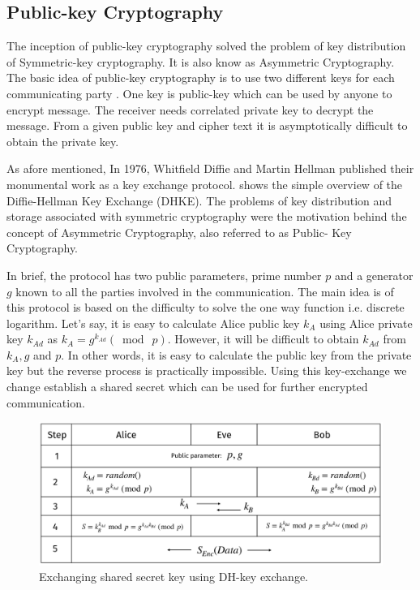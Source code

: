 \subsection{Public-key Cryptography}
\label{ch1_subsec_pkc}
The inception of public-key cryptography solved the problem of key distribution of Symmetric-key cryptography.
It is also know as Asymmetric Cryptography.
The basic idea of  public-key cryptography is to use two different keys for each communicating party .
One key is public-key which can be used by anyone to encrypt message. 
The receiver needs correlated private key to decrypt the message.
From a given public key and cipher text it is asymptotically difficult to obtain the private key.

As afore mentioned, In 1976, Whitfield Diffie and Martin Hellman published their monumental work as a key exchange  protocol\cite{diffie1976new}.  
 shows the simple overview of the Diffie-Hellman Key Exchange (DHKE).
The problems of key distribution and storage associated with symmetric cryptography were the motivation behind the concept of Asymmetric Cryptography, also referred to as Public- Key Cryptography. 

In brief, the protocol has two public parameters, prime number $p$ and a generator $g$ known to all the parties involved in the communication.
The main idea is of this protocol is based on the difficulty to solve the one way function i.e. discrete logarithm.
Let's say, it is easy to calculate Alice public key $k_A$ using Alice private key $k_{Ad}$ as $k_A = g^{k_{Ad}} (\bmod ~p).$ 
However, it will be difficult to obtain $k_{Ad}$ from $k_A, g$ and $p$.
In other words, it is easy to calculate the public key from the private key but the reverse process is practically impossible.
Using this key-exchange we change establish a shared secret which can be used for further encrypted communication.

  \begin{figure}
	\centering
	\includegraphics[width=.9\linewidth, height=.67\textheight, keepaspectratio]{Figures/DHKE}
	\caption{Exchanging shared secret key using DH-key exchange.}
	\label{fig_DHKE}
\end{figure}

